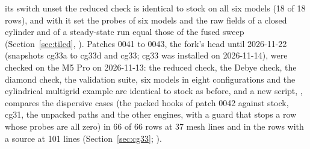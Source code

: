 its switch unset the reduced check is identical to stock on all six models (18 of 18 rows), and with it set the
probes of six models and the raw fields of a closed cylinder and of a steady-state run equal those of the fused
sweep (Section~\ref{sec:tiled}, ).
Patches 0041 to 0043, the fork's head until 2026-11-22 (snapshots cg33a to cg33d and cg33; cg33 was installed on 2026-11-14), were checked on the M5 Pro on
2026-11-13: the reduced check, the Debye check, the diamond check, the validation suite, six models in eight configurations
and the cylindrical multigrid example are identical to stock as before, and a new script, ,
compares the dispersive cases (the packed hooks of patch 0042 against stock, cg31, the unpacked paths and the other engines,
with a guard that stops a row whose probes are all zero) in 66 of 66 rows at 37 mesh lines and in the rows with a source at
101 lines (Section~\ref{sec:cg33}; ).

